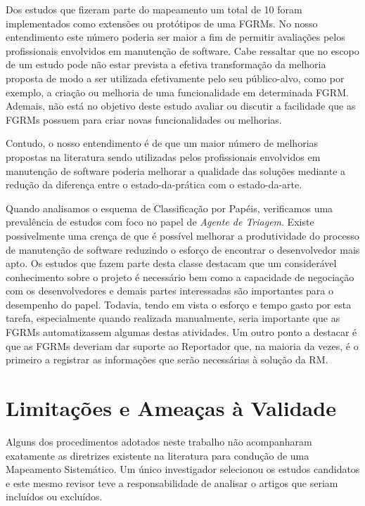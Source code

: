 Dos estudos que fizeram parte do mapeamento um total de 10 foram implementados
como extensões ou protótipos de uma FGRMs. No nosso entendimento este número
poderia ser maior a fim de permitir avaliações pelos profissionais envolvidos em
manutenção de software. Cabe ressaltar que no escopo de um estudo pode não estar
prevista a efetiva transformação da melhoria proposta de modo a ser utilizada
efetivamente pelo seu público-alvo, como por exemplo, a criação ou melhoria de
uma funcionalidade em determinada FGRM\@. Ademais, não está no objetivo deste
estudo avaliar ou discutir a facilidade que as FGRMs possuem para criar novas
funcionalidades ou melhorias.

Contudo, o nosso entendimento é de que um maior número de melhorias propostas na
literatura sendo utilizadas pelos profissionais envolvidos em manutenção de
software poderia melhorar a qualidade das soluções mediante a redução da
diferença entre o estado-da-prática com o estado-da-arte.

Quando analisamos o esquema de Classificação por Papéis, verificamos uma
prevalência de estudos com foco no papel de \textit{Agente de Triagem}. Existe
possivelmente uma crença de que é possível melhorar a produtividade do processo
de manutenção de software reduzindo o esforço de encontrar o desenvolvedor mais
apto. Os estudos que fazem parte desta classe destacam que um considerável
conhecimento sobre o projeto é necessário bem como a capacidade de negociação
com os desenvolvedores e demais partes interessadas são importantes para o
desempenho do papel. Todavia, tendo em vista o esforço e tempo gasto por esta
tarefa, especialmente quando realizada ma\-nu\-al\-men\-te, seria importante que
as FGRMs automatizassem algumas destas atividades. Um outro ponto a destacar é
que as FGRMs deveriam dar suporte ao Reportador que, na maioria da vezes, é o
primeiro a registrar as informações que serão necessárias à solução da RM\@.

\section{Limitações e Ameaças à Validade}
\label{sec:map_limitacoes_ameacas}

Alguns dos procedimentos adotados neste trabalho não acompanharam exatamente as
diretrizes existente na literatura para condução de uma Mapeamento Sistemático.
Um único investigador selecionou os estudos candidatos e este mesmo revisor teve
a responsabilidade de analisar o artigos que seriam incluídos ou excluídos.

